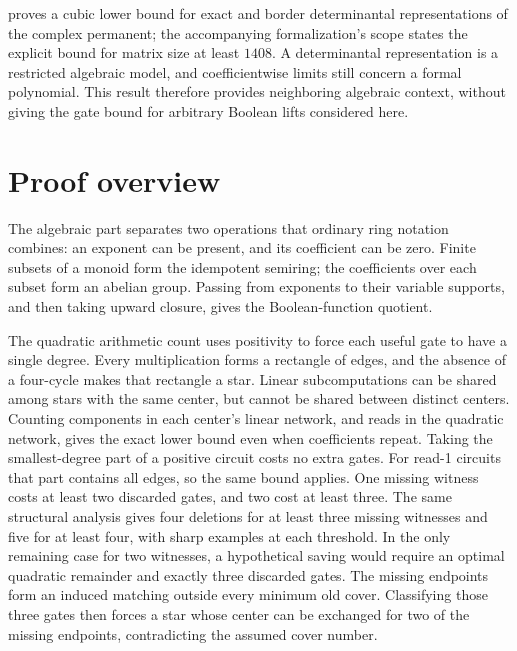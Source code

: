 \documentclass[11pt]{article}
\theoremstyle{definition}
\theoremstyle{remark}
\begin{document}
\citet{OpenAICubic} proves a cubic lower bound for exact and border determinantal representations of the complex permanent; the accompanying formalization's scope states the explicit bound for matrix size at least $1408$. A determinantal representation is a restricted algebraic model, and coefficientwise limits still concern a formal polynomial. This result therefore provides neighboring algebraic context, without giving the gate bound for arbitrary Boolean lifts considered here.

\section{Proof overview}
The algebraic part separates two operations that ordinary ring notation combines: an exponent can be present, and its coefficient can be zero. Finite subsets of a monoid form the idempotent semiring; the coefficients over each subset form an abelian group. Passing from exponents to their variable supports, and then taking upward closure, gives the Boolean-function quotient.

The quadratic arithmetic count uses positivity to force each useful gate to have a single degree. Every multiplication forms a rectangle of edges, and the absence of a four-cycle makes that rectangle a star. Linear subcomputations can be shared among stars with the same center, but cannot be shared between distinct centers. Counting components in each center's linear network, and reads in the quadratic network, gives the exact lower bound even when coefficients repeat. Taking the smallest-degree part of a positive circuit costs no extra gates. For read-1 circuits that part contains all edges, so the same bound applies. One missing witness costs at least two discarded gates, and two cost at least three. The same structural analysis gives four deletions for at least three missing witnesses and five for at least four, with sharp examples at each threshold. In the only remaining case for two witnesses, a hypothetical saving would require an optimal quadratic remainder and exactly three discarded gates. The missing endpoints form an induced matching outside every minimum old cover. Classifying those three gates then forces a star whose center can be exchanged for two of the missing endpoints, contradicting the assumed cover number.
\end{document}
